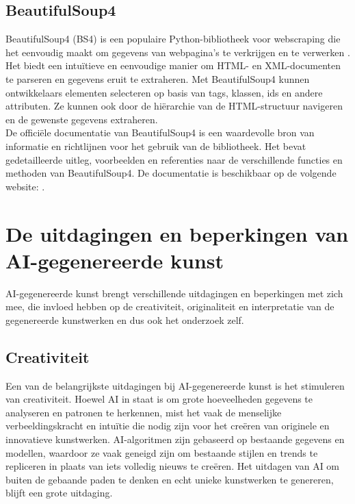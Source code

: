 \subsection{BeautifulSoup4}
BeautifulSoup4 (BS4) is een populaire Python-bibliotheek voor webscraping die het eenvoudig maakt om gegevens van webpagina's te verkrijgen en te verwerken \autocite{BIO2014, BSFOR2015}. \\

Het biedt een intuïtieve en eenvoudige manier om HTML- en XML-documenten te parseren en gegevens eruit te extraheren. Met BeautifulSoup4 kunnen ontwikkelaars elementen selecteren op basis van tags, klassen, ids en andere attributen. Ze kunnen ook door de hiërarchie van de HTML-structuur navigeren en de gewenste gegevens extraheren. \\

De officiële documentatie van BeautifulSoup4 is een waardevolle bron van informatie en richtlijnen voor het gebruik van de bibliotheek. Het bevat gedetailleerde uitleg, voorbeelden en referenties naar de verschillende functies en methoden van BeautifulSoup4. 
De documentatie is beschikbaar op de volgende website: \autocite{BS4Documentation}. \\


\section{De uitdagingen en beperkingen van AI-gegenereerde kunst}
AI-gegenereerde kunst brengt verschillende uitdagingen en beperkingen met zich mee, die invloed hebben op de creativiteit, originaliteit en interpretatie van de gegenereerde kunstwerken en dus ook het onderzoek zelf.

\subsection{Creativiteit}
Een van de belangrijkste uitdagingen bij AI-gegenereerde kunst is het stimuleren van creativiteit. Hoewel AI in staat is om grote hoeveelheden gegevens te analyseren en patronen te herkennen, mist het vaak de menselijke verbeeldingskracht en intuïtie die nodig zijn voor het creëren van originele en innovatieve kunstwerken. AI-algoritmen zijn gebaseerd op bestaande gegevens en modellen, waardoor ze vaak geneigd zijn om bestaande stijlen en trends te repliceren in plaats van iets volledig nieuws te creëren. Het uitdagen van AI om buiten de gebaande paden te denken en echt unieke kunstwerken te genereren, blijft een grote uitdaging.

